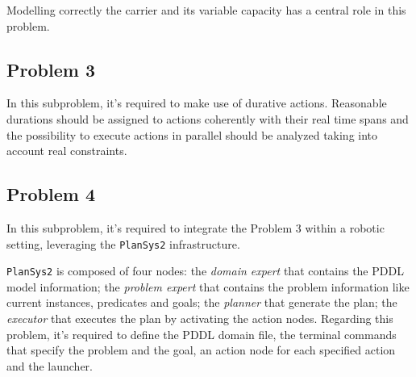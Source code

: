 Modelling correctly the carrier and its variable capacity has a central role in this problem.

\subsection{Problem 3}
In this subproblem, it's required to make use of durative actions.
Reasonable durations should be assigned to actions coherently with their real time spans and the possibility 
to execute actions in parallel should be analyzed taking into account real constraints.

\subsection{Problem 4}
In this subproblem, it's required to integrate the Problem 3 within a robotic setting, leveraging the 
\texttt{PlanSys2} infrastructure.

\texttt{PlanSys2} is composed of four nodes: the \textit{domain expert} that contains the PDDL model 
information; the \textit{problem expert} that contains the problem information like current instances,
predicates and goals; the \textit{planner} that generate the plan; the \textit{executor} that executes
the plan by activating the action nodes.
Regarding this problem, it's required to define the PDDL domain file, the terminal commands that specify
the problem and the goal, an action node for each specified action and the launcher.


